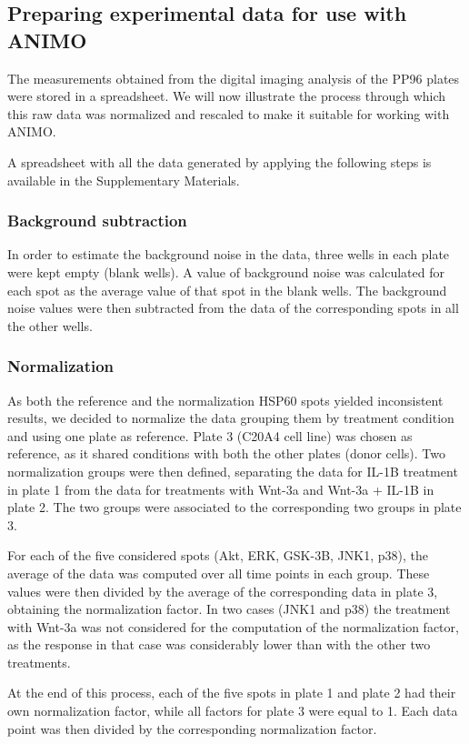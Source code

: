 
\subsection{Preparing experimental data for use with ANIMO}
The measurements obtained from the digital imaging analysis of the PP96 plates were stored in a spreadsheet.
We will now illustrate the process through which this raw data was normalized and rescaled
to make it suitable for working with ANIMO.

A spreadsheet with all the data generated by applying the following steps is available in the Supplementary Materials.

\subsubsection{Background subtraction}
In order to estimate the background noise in the data, three wells in each plate
were kept empty (blank wells). 
A value of background noise was calculated for each spot as the average value of that spot in the blank wells.
The background noise values were then subtracted from the data of the corresponding spots in all the other wells.

\subsubsection{Normalization}
As both the reference and the normalization HSP60 spots yielded inconsistent results,
we decided to normalize the data grouping them by treatment condition and using one plate as reference.
Plate 3 (C20A4 cell line) was chosen as reference, as it shared conditions with both the other plates (donor cells).
Two normalization groups were then defined, separating the data for IL-1B treatment in plate 1 from
the data for treatments with Wnt-3a and Wnt-3a + IL-1B in plate 2.
The two groups were associated to the corresponding two groups in plate 3.

For each of the five considered spots (Akt, ERK, GSK-3B, JNK1, p38),
the average of the data was computed over all time points in each group. These values were then divided
by the average of the corresponding data in plate 3, obtaining the normalization factor.
In two cases (JNK1 and p38) the treatment with Wnt-3a was not considered 
for the computation of the normalization factor, as the response in that case was
considerably lower than with the other two treatments.

At the end of this process, each of the five spots in plate 1 and plate 2 had their own normalization factor, while
all factors for plate 3 were equal to 1. Each data point was then divided by the corresponding normalization factor.

